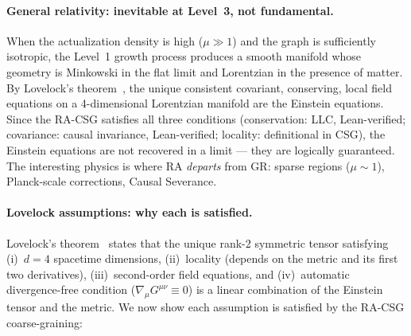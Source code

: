 \documentclass[11pt,a4paper]{article}
\theoremstyle{plain}
\theoremstyle{definition}
\theoremstyle{remark}
\begin{document}
\paragraph{General relativity: inevitable at Level~3, not fundamental.}
When the actualization density is high ($\mu \gg 1$) and the graph is
sufficiently isotropic, the Level~1 growth process produces a smooth
manifold whose geometry is Minkowski in the flat limit and Lorentzian in
the presence of matter. By Lovelock's theorem~\citep{Lovelock1971}, the
unique consistent covariant, conserving, local field equations on a
4-dimensional Lorentzian manifold are the Einstein equations. Since the
RA-CSG satisfies all three conditions (conservation: LLC, Lean-verified;
covariance: causal invariance, Lean-verified; locality: definitional in CSG),
the Einstein equations are not recovered in a limit --- they are logically
guaranteed. The interesting physics is where RA \emph{departs} from GR:
sparse regions ($\mu \sim 1$), Planck-scale corrections, Causal Severance.
\paragraph{Lovelock assumptions: why each is satisfied.}
Lovelock's theorem~\citep{Lovelock1971} states that the unique rank-2
symmetric tensor satisfying (i)~$d=4$ spacetime dimensions, (ii)~locality
(depends on the metric and its first two derivatives), (iii)~second-order
field equations, and (iv)~automatic divergence-free condition
($\nabla_\mu G^{\mu\nu} \equiv 0$) is a linear combination of the Einstein
tensor and the metric. We now show each assumption is satisfied by the
RA-CSG coarse-graining:
\end{document}
